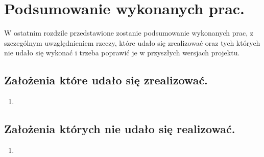 \section{Podsumowanie wykonanych prac.}
W ostatnim rozdzile przedstawione zostanie podsumowanie wykonanych prac, z szczególnym uwzględnieniem rzeczy,
które udało się zrealizować oraz tych których nie udało się wykonać i trzeba poprawić je w przyszłych wersjach projektu.

\subsection{Założenia które udało się zrealizować.}
\begin{enumerate}
    \item
\end{enumerate}

\subsection{Założenia których nie udało się realizować.}
\begin{enumerate}
    \item
\end{enumerate}